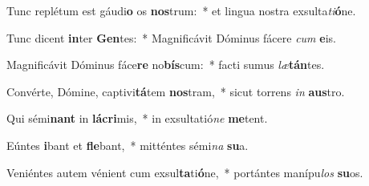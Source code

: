 \item Tunc replétum est gáudi\textbf{o} os \textbf{nos}trum:~* et lingua nostra exsulta\textit{ti}\textbf{ó}ne.
\item Tunc dicent \textbf{in}ter \textbf{Gen}tes:~* Magnificávit Dóminus fácere \textit{cum} \textbf{e}is.
\item Magnificávit Dóminus fáce\textbf{re} no\textbf{bís}cum:~* facti sumus \textit{læ}\textbf{tán}tes.
\item Convérte, Dómine, captivi\textbf{tá}tem \textbf{nos}tram,~* sicut torrens \textit{in} \textbf{aus}tro.
\item Qui sémi\textbf{nant} in \textbf{lá}\textbf{cri}mis,~* in exsultatió\textit{ne} \textbf{me}tent.
\item Eúntes \textbf{i}bant et \textbf{fle}bant,~* mitténtes sémi\textit{na} \textbf{su}a.
\item Veniéntes autem vénient cum exsul\textbf{ta}ti\textbf{ó}ne,~* portántes manípu\textit{los} \textbf{su}os.
